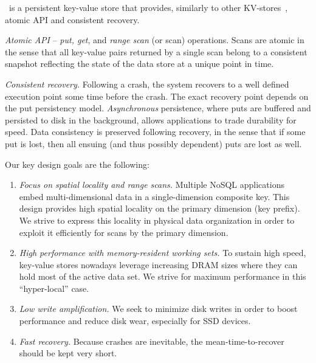 \sys\ is a persistent key-value store that provides, similarly to other KV-stores~\cite{hbase,leveldb,RocksDB}, atomic API and consistent recovery.

\emph{Atomic API} -- \emph{put, get}, and \emph{range scan} (or scan) operations. 
Scans are atomic in the sense that all key-value pairs returned by a single scan belong to a consistent 
snapshot reflecting the state of the data store at a unique point in time.

\emph{Consistent recovery.} Following a crash, the system recovers to a well defined execution 
point some time before the crash. The exact recovery point depends on the put persistency model.
\emph{Asynchronous} persistence, where puts are buffered and persisted to disk in the background, allows 
applications to trade durability for speed. Data consistency is preserved following recovery, 
in the sense that if some put is lost, then all ensuing (and thus possibly dependent) puts are lost as well.

Our key design goals are the following:
\begin{enumerate}\itemsep0pt
\item \emph{Focus on spatial locality and range scans.}
 Multiple NoSQL applications embed multi-dimensional data in a single-dimension composite key. 
 This design provides high spatial locality on the primary dimension (key prefix). We strive
 to express this locality in physical data organization in order to exploit it efficiently for scans
 by the primary dimension. 
 
\item \emph{High performance  with memory-resident working sets.}
To sustain high speed, key-value stores nowadays leverage increasing DRAM sizes 
where they can hold most of the active data set. We strive for maximum performance 
in this ``hyper-local'' case.

\item \emph{Low write amplification.} We seek to minimize disk writes in order to boost performance 
and reduce disk wear, especially for SSD devices. 

\item \emph{Fast recovery.}  Because crashes are inevitable, 
the mean-time-to-recover should be kept very short. 
\end{enumerate}

